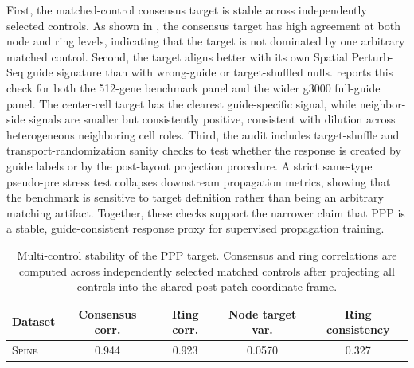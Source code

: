 \documentclass[sigconf,review,balance=false]{acmart}
\newcommand{\methodname}{\textsc{Spine}\xspace}
\begin{document}
First, the matched-control consensus target is stable across independently selected controls. As shown in , the consensus target has high agreement at both node and ring levels, indicating that the target is not dominated by one arbitrary matched control. Second, the target aligns better with its own Spatial Perturb-Seq guide signature than with wrong-guide or target-shuffled nulls.  reports this check for both the 512-gene benchmark panel and the wider g3000 full-guide panel. The center-cell target has the clearest guide-specific signal, while neighbor-side signals are smaller but consistently positive, consistent with dilution across heterogeneous neighboring cell roles. Third, the audit includes target-shuffle and transport-randomization sanity checks to test whether the response is created by guide labels or by the post-layout projection procedure. A strict same-type pseudo-pre stress test collapses downstream propagation metrics, showing that the benchmark is sensitive to target definition rather than being an arbitrary matching artifact. Together, these checks support the narrower claim that PPP is a stable, guide-consistent response proxy for supervised propagation training.

\begin{table}[t]
\centering
\footnotesize
\setlength{\tabcolsep}{6pt}
\renewcommand{\arraystretch}{1.05}
\caption{Multi-control stability of the PPP target. Consensus and ring correlations are computed across independently selected matched controls after projecting all controls into the shared post-patch coordinate frame.}
\label{tab:app_ppp_control_stability}
\begin{tabular}{lcccc}
\toprule
\textbf{Dataset} & \textbf{Consensus corr.} & \textbf{Ring corr.} & \textbf{Node target var.} & \textbf{Ring consistency} \\
\midrule
\methodname{} & 0.944 & 0.923 & 0.0570 & 0.327 \\
\bottomrule
\end{tabular}
\end{table}
\end{document}
